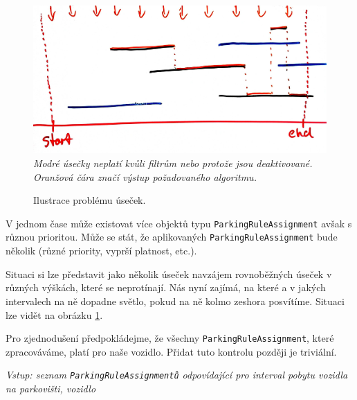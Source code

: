 \begin{figure}[!htb] \centering
  \includegraphics[width=145mm]{../img/rules_drawing.jpg}
  \textit{Modré úsečky neplatí kvůli filtrům nebo protože jsou deaktivované. Oranžová čára značí výstup požadovaného algoritmu.}
  \caption{Ilustrace problému úseček.}
  \label{fig:rules_drawing}
\end{figure}

V jednom čase může existovat více objektů typu \texttt{ParkingRuleAssignment} avšak s různou prioritou.
Může se stát, že aplikovaných \texttt{ParkingRuleAssignment} bude několik (různé priority, vyprší platnost, etc.).

Situaci si lze představit jako několik úseček navzájem rovnoběžných úseček v různých výškách, které se neprotínají.
Nás nyní zajímá, na které a v jakých intervalech na ně dopadne světlo, pokud na ně kolmo zeshora posvítíme.
Situaci lze vidět na obrázku \ref{fig:rules_drawing}.

Pro zjednodušení předpokládejme, že všechny \texttt{ParkingRuleAssignment}, které zpracováváme, platí pro naše vozidlo.
Přidat tuto kontrolu později je triviální.

\textit{Vstup: seznam \texttt{ParkingRuleAssignmentů} odpovídající pro interval pobytu vozidla na parkovišti, vozidlo}

